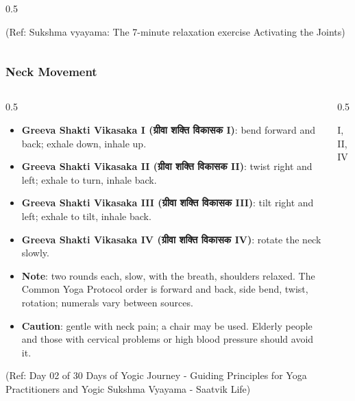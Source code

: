 \begin{frame}[fragile]
\begin{columns}
\begin{column}[T]{0.5\linewidth}
\begin{center}
			{\tiny (Ref: Sukshma vyayama: The 7-minute relaxation exercise Activating the Joints)}		
        \end{center}	
    \end{column}
\end{columns}
\end{frame}

\begin{frame}[fragile]\frametitle{Neck Movement}\footnotesize
\begin{columns}
    \begin{column}[T]{0.5\linewidth}
      \begin{itemize}
		\item \textbf{Greeva Shakti Vikasaka I (ग्रीवा शक्ति विकासक I)}: bend forward and back; exhale down, inhale up.
		\item \textbf{Greeva Shakti Vikasaka II (ग्रीवा शक्ति विकासक II)}: twist right and left; exhale to turn, inhale back.
		\item \textbf{Greeva Shakti Vikasaka III (ग्रीवा शक्ति विकासक III)}: tilt right and left; exhale to tilt, inhale back.
		\item \textbf{Greeva Shakti Vikasaka IV (ग्रीवा शक्ति विकासक IV)}: rotate the neck slowly.
		\item \textbf{Note}: two rounds each, slow, with the breath, shoulders relaxed. The Common Yoga Protocol order is forward and back, side bend, twist, rotation; numerals vary between sources.
		\item \textbf{Caution}: gentle with neck pain; a chair may be used. Elderly people and those with cervical problems or high blood pressure should avoid it.
	  \end{itemize}
	  
				{\tiny (Ref: Day 02 of 30 Days of Yogic Journey - Guiding Principles for Yoga Practitioners and Yogic Sukshma Vyayama - Saatvik Life)}		  
    \end{column}
    \begin{column}[T]{0.5\linewidth}
		\begin{center}
		I, II, IV
		

\end{center}
\end{column}
\end{columns}
\end{frame}
